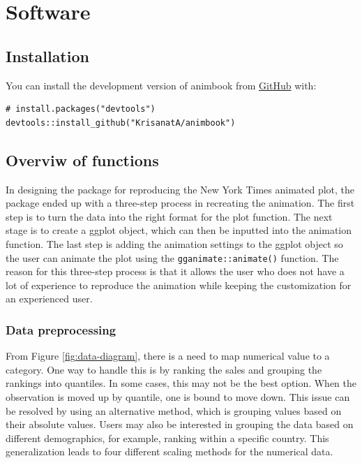 \hypertarget{software}{%
\section{Software}\label{software}}

\hypertarget{installation}{%
\subsection{Installation}\label{installation}}

You can install the development version of animbook from \href{https://github.com/KrisanatA/animbook}{GitHub} with:

\begin{verbatim}
# install.packages("devtools")
devtools::install_github("KrisanatA/animbook")
\end{verbatim}

\hypertarget{overviw-of-functions}{%
\subsection{Overviw of functions}\label{overviw-of-functions}}

In designing the package for reproducing the New York Times animated plot, the package ended up with a three-step process in recreating the animation. The first step is to turn the data into the right format for the plot function. The next stage is to create a ggplot object, which can then be inputted into the animation function. The last step is adding the animation settings to the ggplot object so the user can animate the plot using the \texttt{gganimate::animate()} function. The reason for this three-step process is that it allows the user who does not have a lot of experience to reproduce the animation while keeping the customization for an experienced user.

\hypertarget{data-preprocessing}{%
\subsubsection{Data preprocessing}\label{data-preprocessing}}

From Figure \ref{fig:data-diagram}, there is a need to map numerical value to a category. One way to handle this is by ranking the sales and grouping the rankings into quantiles. In some cases, this may not be the best option. When the observation is moved up by quantile, one is bound to move down. This issue can be resolved by using an alternative method, which is grouping values based on their absolute values. Users may also be interested in grouping the data based on different demographics, for example, ranking within a specific country. This generalization leads to four different scaling methods for the numerical data.


